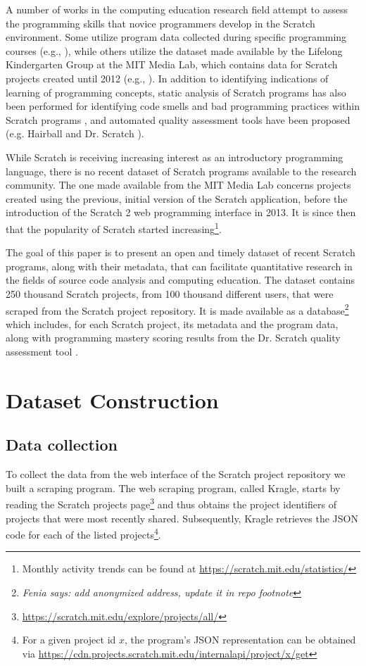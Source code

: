 \documentclass[10pt, conference]{IEEEtran}
\newcommand{\fenia}[1]{\emph{\color{blue}Fenia says: #1}}
\begin{document}
A number of works in the computing education research field attempt to assess the programming skills that novice programmers develop in the Scratch environment.
Some utilize program data collected during specific programming courses (e.g., \cite{meerbaum-salant_learning_2010, wilson_evaluation_2012, Maloney_2008}), while others utilize the dataset made available by the Lifelong Kindergarten Group at the MIT Media Lab, which contains data for Scratch projects created until 2012 (e.g., \cite{fields_2014, yang_2015, Dasgupta_2016}).
In addition to identifying indications of learning of programming concepts, static analysis of Scratch programs has also been performed for identifying code smells and bad programming practices within Scratch programs \cite{Meerbaum_habits_2011, Aivaloglou_2016}, and automated quality assessment tools have been proposed (e.g. Hairball \cite{boe_hairball:_2013} and Dr. Scratch \cite{moreno_automatic_2014}).

While Scratch is receiving increasing interest as an introductory programming language, there is no recent dataset of Scratch programs available to the research community.
The one made available from the MIT Media Lab concerns projects created using the previous, initial version of the Scratch application, before the introduction of the Scratch 2 web programming interface in 2013.
It is since then that the popularity of Scratch started increasing\footnote{Monthly activity trends can be found at \url{https://scratch.mit.edu/statistics/}}.

The goal of this paper is to present an open and timely dataset of recent Scratch programs, along with their metadata, that can facilitate quantitative research in the fields of source code analysis and computing education.
The dataset contains 250 thousand Scratch projects, from 100 thousand different users, that were scraped from the Scratch project repository.
It is made available as a database\footnote{{\fenia{add anonymized address, update it in repo footnote}}} which includes, for each Scratch project, its metadata and the program data, along with programming mastery scoring results from the Dr. Scratch quality assessment tool \cite{moreno_automatic_2014}.

\section{Dataset Construction}
\label{dataset}

\subsection{Data collection}
To collect the data from the web interface of the Scratch project repository we built a scraping program.
The web scraping program, called Kragle, starts by reading the Scratch projects page\footnote{\label{scratchpublic}\url{https://scratch.mit.edu/explore/projects/all/}} and thus obtains the project identifiers of projects that were most recently shared.
Subsequently, Kragle retrieves the JSON code for each of the listed projects\footnote{For a given project id $x$, the program's JSON representation can be obtained via \url{https://cdn.projects.scratch.mit.edu/internalapi/project/x/get}}.
\end{document}
